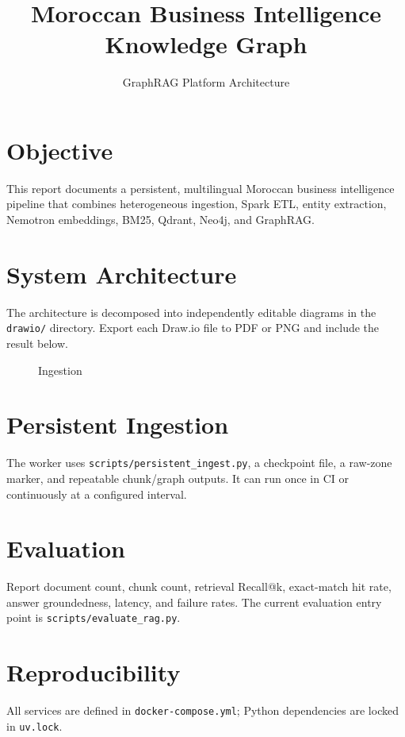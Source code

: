 \documentclass[11pt]{article}
\title{Moroccan Business Intelligence Knowledge Graph}
\author{GraphRAG Platform Architecture}
\begin{document}
\maketitle
\tableofcontents
\section{Objective}
This report documents a persistent, multilingual Moroccan business intelligence
pipeline that combines heterogeneous ingestion, Spark ETL, entity extraction,
Nemotron embeddings, BM25, Qdrant, Neo4j, and GraphRAG.
\section{System Architecture}
The architecture is decomposed into independently editable diagrams in the
\texttt{drawio/} directory. Export each Draw.io file to PDF or PNG and include
the result below.
\begin{figure}[h]\centering{}\caption{Ingestion}\end{figure}
\section{Persistent Ingestion}
The worker uses \texttt{scripts/persistent\_ingest.py}, a checkpoint file, a
raw-zone marker, and repeatable chunk/graph outputs. It can run once in CI or
continuously at a configured interval.
\section{Evaluation}
Report document count, chunk count, retrieval Recall@k, exact-match hit rate,
answer groundedness, latency, and failure rates. The current evaluation entry
point is \texttt{scripts/evaluate\_rag.py}.
\section{Reproducibility}
All services are defined in \texttt{docker-compose.yml}; Python dependencies
are locked in \texttt{uv.lock}.
\end{document}
